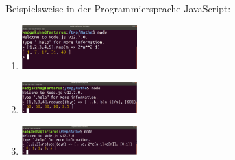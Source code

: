 \item Beispielsweise in der Programmiersprache JavaScript:
\begin{enumerate}
\item 
\includegraphics[width=0.35\textwidth]{../pool/ex-sequence-1-img-a.png}
\item
\includegraphics[width=0.35\textwidth]{../pool/ex-sequence-1-img-b.png}
\item 
\includegraphics[width=0.35\textwidth]{../pool/ex-sequence-1-img-c.png}
\end{enumerate}

